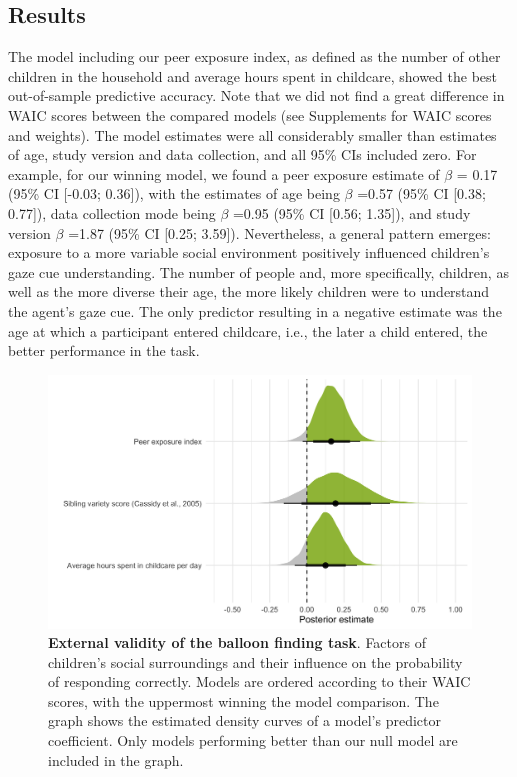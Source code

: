 \documentclass[
  man,floatsintext]{apa6}
\begin{document}
\hypertarget{results-2}{%
\subsection{Results}\label{results-2}}

The model including our peer exposure index, as defined as the number of other children in the household and average hours spent in childcare, showed the best out-of-sample predictive accuracy. Note that we did not find a great difference in WAIC scores between the compared models (see Supplements for WAIC scores and weights). The model estimates were all considerably smaller than estimates of age, study version and data collection, and all 95\% CIs included zero. For example, for our winning model, we found a peer exposure estimate of \(\beta\) =
0.17 (95\% CI {[}-0.03; 0.36{]}),
with the estimates of age being \(\beta\) =0.57 (95\% CI {[}0.38; 0.77{]}), data collection mode being \(\beta\) =0.95 (95\% CI {[}0.56; 1.35{]}), and study version \(\beta\) =1.87 (95\% CI {[}0.25; 3.59{]}). Nevertheless, a general pattern emerges: exposure to a more variable social environment positively influenced children's gaze cue understanding. The number of people and, more specifically, children, as well as the more diverse their age, the more likely children were to understand the agent's gaze cue. The only predictor resulting in a negative estimate was the age at which a participant entered childcare, i.e., the later a child entered, the better performance in the task.




\begin{figure}

{\centering \includegraphics[width=1\linewidth]{../figures/extvali_results} 

}

\caption{\textbf{External validity of the balloon finding task}.
Factors of children's social surroundings and their influence on the probability of responding correctly. Models are ordered according to their WAIC scores, with the uppermost winning the model comparison. The graph shows the estimated density curves of a model's predictor coefficient. Only models performing better than our null model are included in the graph.}\label{fig:fig4}
\end{figure}
\end{document}
